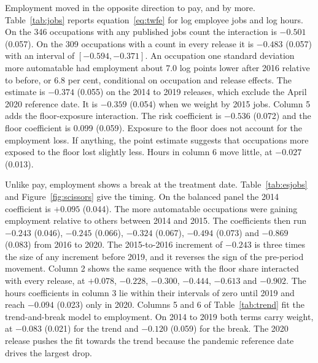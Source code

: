 \documentclass[12pt,leqno]{article}
\begin{document}
Employment moved in the opposite direction to pay, and by more. Table~\ref{tab:jobs} reports equation~\eqref{eq:twfe} for log employee jobs and log hours. On the 346 occupations with any published jobs count the interaction is $-0.501$ (0.057). On the 309 occupations with a count in every release it is $-0.483$ (0.057) with an interval of $[-0.594, -0.371]$. An occupation one standard deviation more automatable had employment about 7.0 log points lower after 2016 relative to before, or 6.8 per cent, conditional on occupation and release effects. The estimate is $-0.374$ (0.055) on the 2014 to 2019 releases, which exclude the April 2020 reference date. It is $-0.359$ (0.054) when we weight by 2015 jobs. Column 5 adds the floor-exposure interaction. The risk coefficient is $-0.536$ (0.072) and the floor coefficient is 0.099 (0.059). Exposure to the floor does not account for the employment loss. If anything, the point estimate suggests that occupations more exposed to the floor lost slightly less. Hours in column 6 move little, at $-0.027$ (0.013).



Unlike pay, employment shows a break at the treatment date. Table~\ref{tab:esjobs} and Figure~\ref{fig:scissors} give the timing. On the balanced panel the 2014 coefficient is $+0.095$ (0.044). The more automatable occupations were gaining employment relative to others between 2014 and 2015. The coefficients then run $-0.243$ (0.046), $-0.245$ (0.066), $-0.324$ (0.067), $-0.494$ (0.073) and $-0.869$ (0.083) from 2016 to 2020. The 2015-to-2016 increment of $-0.243$ is three times the size of any increment before 2019, and it reverses the sign of the pre-period movement. Column 2 shows the same sequence with the floor share interacted with every release, at $+0.078$, $-0.228$, $-0.300$, $-0.444$, $-0.613$ and $-0.902$. The hours coefficients in column 3 lie within their intervals of zero until 2019 and reach $-0.094$ (0.023) only in 2020. Columns 5 and 6 of Table~\ref{tab:trend} fit the trend-and-break model to employment. On 2014 to 2019 both terms carry weight, at $-0.083$ (0.021) for the trend and $-0.120$ (0.059) for the break. The 2020 release pushes the fit towards the trend because the pandemic reference date drives the largest drop.
\end{document}
